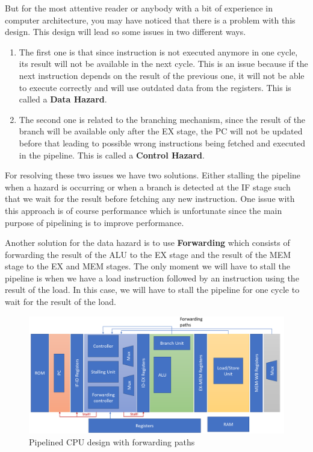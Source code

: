 But for the most attentive reader or anybody with a bit of experience in computer architecture, you may have noticed that there is a problem with this design. 
This design will lead so some issues in two different ways. 

\begin{enumerate}[label=\textbullet]
    \item The first one is that since instruction is not executed anymore in one cycle, its result will not be available in the next cycle.
    This is an issue because if the next instruction depends on the result of the previous one, it will not be able to execute correctly and will use 
    outdated data from the registers. This is called a \textbf{Data Hazard}.
    \item The second one is related to the branching mechanism, since the result of the branch will be available only after the EX stage, the PC will not be updated
    before that leading to possible wrong instructions being fetched and executed in the pipeline. This is called a \textbf{Control Hazard}.
\end{enumerate}

For resolving these two issues we have two solutions. Either stalling the pipeline when a hazard is occurring or when a branch is detected at the IF stage such that we wait for 
the result before fetching any new instruction. One issue with this approach is of course performance which is unfortunate since the main purpose of pipelining is to improve performance.

Another solution for the data hazard is to use \textbf{Forwarding} which consists of forwarding the result of the ALU to the EX stage and the result of the MEM stage to the EX and MEM stages.
The only moment we will have to stall the pipeline is when we have a load instruction followed by an instruction using the result of the load. In this case, we will have to stall the pipeline
for one cycle to wait for the result of the load.

\begin{figure}[H]
    \centering
    \includegraphics[width=1\textwidth]{design/pipelined/images/pipelined_design_forwarding.png}
    \caption{Pipelined CPU design with forwarding paths}
    \label{fig:pipelined_cpu_design_forwarding}
\end{figure}

